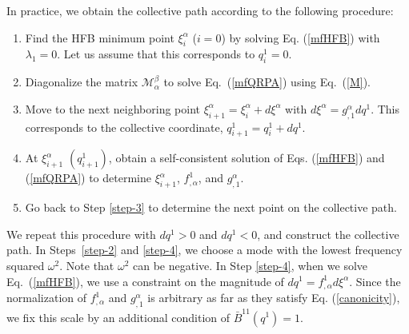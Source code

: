 \documentclass[%
superscriptaddress,
showpacs,
nofootinbib,
amsmath,amssymb,
aps,
prc,
twocolumn,
floatfix ]%
{revtex4-1}
\begin{document}
In practice, we obtain the collective path according to the following procedure:
\begin{enumerate}
\item Find the HFB minimum point $\xi^\alpha_i$ ($i=0$)
	by solving Eq. (\ref{mfHFB}) with $\lambda_1=0$.
	Let us assume that this corresponds to $q^1_i=0$.
\item \label{step-2}
	Diagonalize the matrix $\mathcal{M}^{\beta}_{\alpha}$
to solve Eq.~(\ref{mfQRPA}) using Eq.~(\ref{M}).
\item \label{step-3}
Move to the next neighboring point
$\xi^\alpha_{i+1}=\xi^\alpha_{i}+d\xi^\alpha$
with $d\xi^{\alpha}=g^{\alpha}_{,1}dq^1$.
This corresponds to the collective coordinate, $q^1_{i+1}=q^1_i+dq^1$.
\item \label{step-4}
At $\xi_{i+1}^\alpha$ $(q^1_{i+1})$,
obtain a self-consistent solution of
Eqs. (\ref{mfHFB}) and (\ref{mfQRPA})
to determine
$\xi^\alpha_{i+1}$, $f^1_{,\alpha}$, and $g^\alpha_{,1}$.
\item Go back to Step \ref{step-3} to determine the next point
on the collective path.
\end{enumerate}
We repeat this procedure with $dq^1 > 0$ and $dq^1<0$, and
construct the collective path.
In Steps~\ref{step-2} and \ref{step-4}, we choose a mode
with the lowest frequency squared $\omega^2$.
Note that $\omega^2$ can be negative.
In Step \ref{step-4}, when we solve Eq.~(\ref{mfHFB}), we use
a constraint on the magnitude of $dq^1=f^1_{,\alpha}d\xi^{\alpha}$.
Since the normalization of $f^1_{,\alpha}$ and $g^\alpha_{,1}$ is
arbitrary as far as they satisfy Eq. (\ref{canonicity}),
we fix this scale by an additional condition of $\bar{B}^{11}(q^1)=1$.
\end{document}
